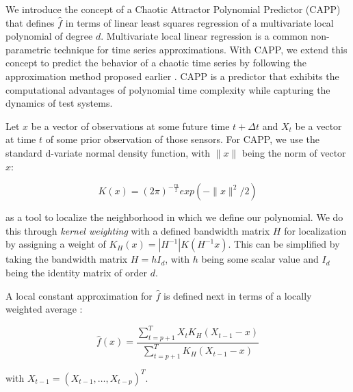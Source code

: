 \documentclass[times,10pt,finalversion]{usetex-v1}
\begin{document}
We introduce the concept of a Chaotic Attractor Polynomial Predictor
(CAPP) that defines $\hat{f}$ in terms of linear least squares
regression of a multivariate local polynomial of degree $d$.
Multivariate local linear regression is a common non-parametric
technique for time series approximations.  With CAPP, we extend this
concept to predict the behavior of a chaotic time series by following
the approximation method proposed earlier \cite{Itoh1995}. CAPP is a
predictor that exhibits the computational advantages of polynomial time
complexity while capturing the dynamics of test systems.

Let $x$ be a vector of observations at some future time $t+\Delta
t$ and $X_{t}$ be a vector at time $t$ of some prior observation of
those sensors. For CAPP, we use the standard d-variate normal density
function, with $\|x\|$ being the norm of vector $x$:
{\setlength{\abovedisplayskip}{0pt plus 0pt minus 0pt}
 \setlength{\belowdisplayskip}{0pt plus 0pt minus 0pt}
\begin{small}
  \begin{equation}
K(x)=(2\pi)^{-\frac{m}{2}}exp(-\|x\|^{2}/2)\nonumber
\end{equation}
\end{small}}
as a tool to localize the
neighborhood in which we define our polynomial.  We do this through
\textit{kernel weighting} with a defined bandwidth matrix $H$ for
localization by assigning a weight of $ K_{H}(x)=|H^{-1}|K(H^{-1}x)$.  This
can be simplified by taking the bandwidth matrix $H=hI_{d}$, with $h$
being some scalar value and $I_{d}$ being the identity matrix of order
$d$.

A local constant approximation for $\hat{f}$ is defined next
in terms of a locally weighted average \cite{Box1994}:
{\setlength{\abovedisplayskip}{0pt plus 0pt minus 0pt}
 \setlength{\belowdisplayskip}{0pt plus 0pt minus 0pt}
\begin{small}
  \begin{equation}
    \label{eq:localconst}
    \hat{f}(x)=\dfrac{\displaystyle\sum_{t=p+1}^{T}X_{t}K_{H}(X_{t-1}-x)}{\displaystyle\sum_{t=p+1}^{T}K_{H}(X_{t-1}-x)}\nonumber
  \end{equation}
\end{small}}
with $X_{t-1}=(X_{t-1},\ldots,X_{t-p})^{T}$.
\end{document}
